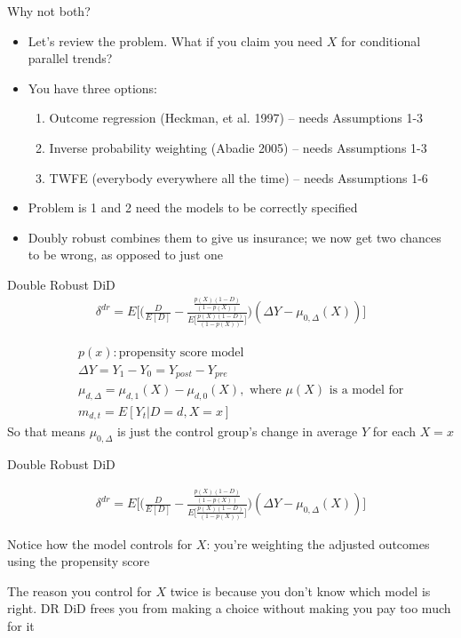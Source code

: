 \documentclass{beamer}
\begin{document}
\begin{frame}{Why not both?}

\begin{itemize}
\item Let's review the problem.  What if you claim you need $X$ for conditional parallel trends?
\item You have three options:
	\begin{enumerate}
	\item Outcome regression (Heckman, et al. 1997) -- needs Assumptions 1-3
	\item Inverse probability weighting (Abadie 2005) -- needs Assumptions 1-3
	\item TWFE (everybody everywhere all the time) -- needs Assumptions 1-6
	\end{enumerate}
\item Problem is 1 and 2 need the models to be correctly specified
\item Doubly robust combines them to give us insurance; we now get two chances to be wrong, as opposed to just one
\end{itemize}

\end{frame}


\begin{frame}{Double Robust DiD}
\begin{eqnarray*}
\delta^{dr} = E \bigg [ \bigg ( \frac{D}{E[D]} -\frac{ \frac{p(X)(1-D)}{(1-p(X))} }{E \bigg [\frac{p(X)(1-D)}{(1-p(X))} \bigg ]} \bigg  )( \Delta Y - \mu_{0,\Delta}(X)) \bigg ]
\end{eqnarray*}

\begin{eqnarray*}
&&p(x): \text{propensity score model} \\
&& \Delta Y = Y_1 - Y_0 = Y_{post} - Y_{pre} \\
&& \mu_{d,\Delta} = \mu_{d,1}(X) - \mu_{d,0}(X), \text{ where } \mu(X) \text{ is a model for} \\
&& m_{d,t} = E[Y_t|D=d,X=x]
\end{eqnarray*}So that means $\mu_{0,\Delta}$ is just the control group's change in average $Y$ for each $X=x$

\end{frame}

\begin{frame}{Double Robust DiD}

\begin{eqnarray*}
\delta^{dr} = E \bigg [ \bigg ( \frac{D}{E[D]} -\frac{ \frac{p(X)(1-D)}{(1-p(X))} }{E \bigg [\frac{p(X)(1-D)}{(1-p(X))} \bigg ]} \bigg  )( \Delta Y - \mu_{0,\Delta}(X)) \bigg ]
\end{eqnarray*}

Notice how the model controls for $X$: you're weighting the adjusted outcomes using the propensity score

\bigskip

The reason you control for $X$ twice is because you don't know which model is right.  DR DiD frees you from making a choice without making you pay too much for it


\end{frame}
\end{document}
